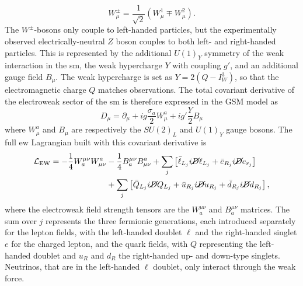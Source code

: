 \begin{equation}\label{eq-weak-lic}
    W_{\mu}^{\pm} = \frac{1}{\sqrt{2}} \left(W_{\mu}^{1} \mp W_{\mu}^{2} \right).
\end{equation}
The $W^{\pm}$-bosons only couple to left-handed particles, but the experimentally observed electrically-neutral $Z$ boson couples to both left- and right-handed particles. This is represented by the additional $U(1)_Y$ symmetry of the weak interaction in the \gls{sm}, the weak hypercharge $Y$ with coupling $g'$, and an additional gauge field $B_{\mu}$. The weak hypercharge is set as $Y = 2 (Q - I_W^3)$, so that the electromagnetic charge $Q$ matches observations. The total covariant derivative of the electroweak sector of the \gls{sm} is therefore expressed in the GSM model as 
\begin{equation}\label{eq-GaugeEW}
    D_{\mu}  = \partial_{\mu} + ig \frac{\sigma_a}{2} W_{\mu}^a + ig' \frac{Y}{2} B_{\mu}
\end{equation}
where $W_{\mu}^a$ and $B_{\mu}$ are respectively the $SU(2)_L$ and $U(1)_Y$ gauge bosons. The full \gls{ew} Lagrangian built with this covariant derivative is
\begin{equation}\label{eq-EWlag}
    \begin{split}
        \mathcal{L}_{\text{EW}} = - \frac{1}{4} W_a^{\mu\nu} W^a_{\mu\nu} &- \frac{1}{4} B_a^{\mu\nu} B^a_{\mu\nu} + \sum_{j} \left[ \bar{\ell}_{L_j}i\cancel{D}\ell_{L_j} + \bar{e}_{R_j}i\cancel{D}e_{r_j}  \right] \\
        &+ \sum_{j} \left[ \bar{Q}_{L_j}i\cancel{D}Q_{L_j} + \bar{u}_{R_j}i\cancel{D}u_{R_j} + \bar{d}_{R_j}i\cancel{D}d_{R_j} \right],
    \end{split}
\end{equation}
where the electroweak field strength tensors are the $W_a^{\mu\nu}$ and $B_a^{\mu\nu}$ matrices. The sum over $j$ represents the three fermionic generations, each introduced separately for the lepton fields, with the left-handed doublet $\ell$ and the right-handed singlet $e$ for the charged lepton, and the quark fields, with $Q$ representing the left-handed doublet and $u_R$ and $d_R$ the right-handed up- and down-type singlets. Neutrinos, that are in the left-handed $\ell$ doublet, only interact through the weak force. \\

